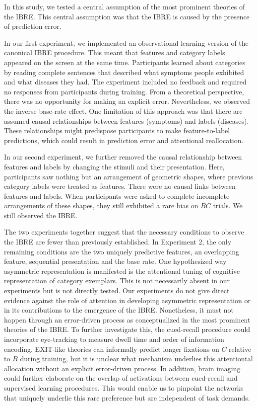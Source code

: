 \documentclass[10pt,letterpaper]{article}
\begin{document}
In this study, we tested a central assumption of the most prominent theories of the IBRE.
This central assumption was that the IBRE is caused by the presence of prediction error.

In our first experiment, we implemented an observational learning version of the canonical IBRE procedure.
This meant that features and category labels appeared on the screen at the same time.
Participants learned about categories by reading complete sentences that described what symptoms people exhibited and what diseases they had.
The experiment included no feedback and required no responses from participants during training.
From a theoretical perspective, there was no opportunity for making an explicit error.
Nevertheless, we observed the inverse base-rate effect.
One limitation of this approach was that there are assumed causal relationships between features (symptoms) and labels (diseases).
These relationships might predispose participants to make feature-to-label predictions, which could result in prediction error and attentional reallocation.

In our second experiment, we further removed the causal relationship between features and labels by changing the stimuli and their presentation.
Here, participants saw nothing but an arrangement of geometric shapes, where previous category labels were treated as features.
There were no causal links between features and labels.
When participants were asked to complete incomplete arrangements of these shapes, they still exhibited a rare bias on $BC$ trials.
We still observed the IBRE.

The two experiments together suggest that the necessary conditions to observe the IBRE are fewer than previously established.
In Experiment 2, the only remaining conditions are the two uniquely predictive features, an overlapping feature, sequential presentation and the base rate.
One hypothesized way asymmetric representation is manifested is the attentional tuning of cognitive representation of category exemplars.
This is not necessarily absent in our experiments but is not directly tested.
Our experiments do not give direct evidence against the role of attention in developing asymmetric representation or in its contributions to the emergence of the IBRE.
Nonetheless, it must not happen through an error-driven process as conceptualized in the most prominent theories of the IBRE.
To further investigate this, the cued-recall procedure could incorporate eye-tracking to measure dwell time and order of information encoding.
EXIT-like theories can informally predict longer fixations on $C$ relative to $B$ during training, but it is unclear what mechanism underlies this attentiontal allocation without an explicit error-driven process.
In addition, brain imaging could further elaborate on the overlap of activations between cued-recall and supervised learning procedures.
This would enable us to pinpoint the networks that uniquely underlie this rare preference but are independent of task demands.
\end{document}

